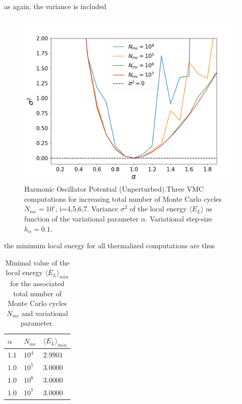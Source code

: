 \documentclass[aip,nobalancelastpage,
twocolumn,
rsi,%
 amsmath,amssymb,
 reprint,%
]{revtex4}
\begin{document}
as again, the variance is included 

\begin{figure}[H]
\center
\includegraphics[scale=0.33]{figsPartI/IStabilityThermalizedSigma.png}
\caption{Harmonic Oscillator Potential (Unperturbed).\newline Three VMC computations for increasing total number of Monte Carlo cycles $N_{mc}=10^i$, i=4,5,6,7. Variance $\sigma^2$ of the local energy $\langle E_L \rangle$ as function of the variational parameter $\alpha$. Variational step-size $h_\alpha = 0.1$.}
\label{Ifig4}
\end{figure}

the minimum local energy for all thermalized computations are thus 

\begin{table}[H]
\center
\caption{Minimal value of the local energy $\langle E_L\rangle_{min}$ for the associated total number of Monte Carlo cycles $N_{mc}$ and variational parameter.}
\begin{tabular}{| p{2cm} | p{2cm} | p{2cm} |}
\hline
$\alpha$ & $N_{mc}$ & $\langle E_L \rangle_{min}$ \\
\hline
$1.1$ & $10^4$ & $2.9901$\\
\hline
$1.0$ & $10^5$ & $3.0000$\\
\hline
$1.0$ & $10^6$ & $3.0000 $\\
\hline
$1.0$ & $10^7$ & $3.0000 $\\
\hline
\end{tabular}
\label{resItable1}
\end{table}
\end{document}
